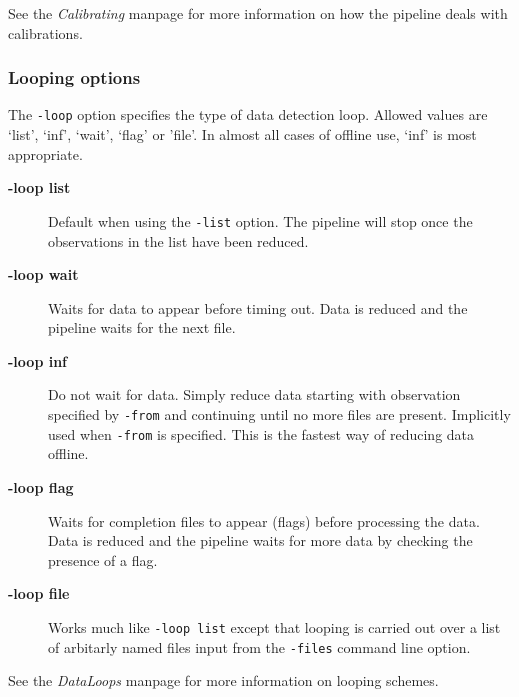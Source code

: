\documentclass[twoside,11pt]{article}
\newcommand{\xlabel}[1]{}
\renewcommand{\_}{\texttt{\symbol{95}}}
\begin{document}
See the \emph{Calibrating} manpage for more information on how the pipeline deals
with calibrations.

\subsubsection*{\xlabel{looping_options}Looping options\label{oracdr_Looping_options}}

The \texttt{-loop} option specifies the type of data detection loop. Allowed
values are `list', `inf', `wait', `flag' or 'file'. In almost all cases of
offline use, `inf' is most appropriate.

\begin{description}
\item[\textbf{-loop list}] \mbox{}

Default when using the \texttt{-list} option. The pipeline will stop
once the observations in the list have been reduced.

\item[\textbf{-loop wait}] \mbox{}

Waits for data to appear before timing out. Data is reduced and the pipeline
waits for the next file.

\item[\textbf{-loop inf}] \mbox{}

Do not wait for data. Simply reduce data starting with observation
specified by \texttt{-from} and continuing until no more files are present.
Implicitly used when \texttt{-from} is specified. This is the fastest way
of reducing data offline.

\item[\textbf{-loop flag}] \mbox{}

Waits for completion files to appear (flags) before processing the data.
Data is reduced and the pipeline waits for more data by checking the
presence of a flag.

\item[\textbf{-loop file}] \mbox{}

Works much like \texttt{-loop list} except that looping is carried out over a
list of arbitarly named files input from the \texttt{-files} command line option.

\end{description}


See the \emph{DataLoops} manpage for more
information on looping schemes.
\end{document}
